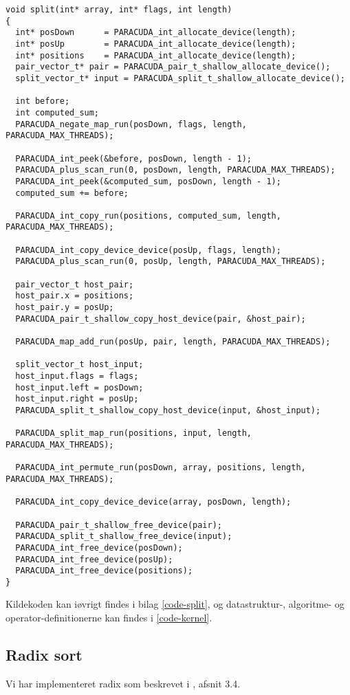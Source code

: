 \begin{verbatim}
void split(int* array, int* flags, int length)
{
  int* posDown      = PARACUDA_int_allocate_device(length);
  int* posUp        = PARACUDA_int_allocate_device(length);
  int* positions    = PARACUDA_int_allocate_device(length);
  pair_vector_t* pair = PARACUDA_pair_t_shallow_allocate_device();
  split_vector_t* input = PARACUDA_split_t_shallow_allocate_device();

  int before;
  int computed_sum;
  PARACUDA_negate_map_run(posDown, flags, length, PARACUDA_MAX_THREADS);

  PARACUDA_int_peek(&before, posDown, length - 1);
  PARACUDA_plus_scan_run(0, posDown, length, PARACUDA_MAX_THREADS);
  PARACUDA_int_peek(&computed_sum, posDown, length - 1);
  computed_sum += before;

  PARACUDA_int_copy_run(positions, computed_sum, length, PARACUDA_MAX_THREADS);

  PARACUDA_int_copy_device_device(posUp, flags, length);
  PARACUDA_plus_scan_run(0, posUp, length, PARACUDA_MAX_THREADS);

  pair_vector_t host_pair;
  host_pair.x = positions;
  host_pair.y = posUp;
  PARACUDA_pair_t_shallow_copy_host_device(pair, &host_pair);

  PARACUDA_map_add_run(posUp, pair, length, PARACUDA_MAX_THREADS);

  split_vector_t host_input;
  host_input.flags = flags;
  host_input.left = posDown;
  host_input.right = posUp;
  PARACUDA_split_t_shallow_copy_host_device(input, &host_input);

  PARACUDA_split_map_run(positions, input, length, PARACUDA_MAX_THREADS);

  PARACUDA_int_permute_run(posDown, array, positions, length, PARACUDA_MAX_THREADS);

  PARACUDA_int_copy_device_device(array, posDown, length);

  PARACUDA_pair_t_shallow_free_device(pair);
  PARACUDA_split_t_shallow_free_device(input);
  PARACUDA_int_free_device(posDown);
  PARACUDA_int_free_device(posUp);
  PARACUDA_int_free_device(positions);
}
\end{verbatim}

Kildekoden kan iøvrigt findes i bilag \ref{code-split}, 
og datastruktur-, algoritme- og operator-definitionerne
kan findes i \ref{code-kernel}.

\subsection{Radix sort}
\label{radixsort}
Vi har implementeret radix som beskrevet i \cite{ble}, afsnit 3.4.

